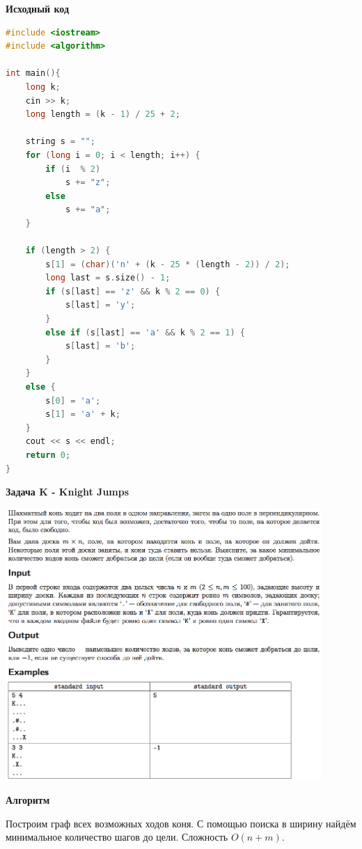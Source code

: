 \documentclass[a4paper,12pt]{article}
\begin{document}
\textbf{{\large Исходный код}} \\
\begin{lstlisting}[language=C++]
#include <iostream>
#include <algorithm>

int main(){
    long k;
    cin >> k;
    long length = (k - 1) / 25 + 2;

    string s = "";
    for (long i = 0; i < length; i++) {
        if (i  % 2)
            s += "z";
        else
            s += "a";
    }

    if (length > 2) {
        s[1] = (char)('n' + (k - 25 * (length - 2)) / 2);
        long last = s.size() - 1;
        if (s[last] == 'z' && k % 2 == 0) {
            s[last] = 'y';
        }
        else if (s[last] == 'a' && k % 2 == 1) {
            s[last] = 'b';
        }
    }
    else {
        s[0] = 'a';
        s[1] = 'a' + k;
    }
    cout << s << endl;
    return 0;
}
\end{lstlisting}

\newpage
\textbf{{\large Задача K - Knight Jumps}}

\begin{center}
\includegraphics[width=0.9\textwidth]{OC_America/OC_America_K.png}\\ [1cm]
\end{center}

\newpage
\textbf{{\large Алгоритм}}

Построим граф всех возможных ходов коня. С помощью поиска в ширину найдём минимальное количество шагов до цели. Сложность $O(n+m)$.\\
\end{document}
